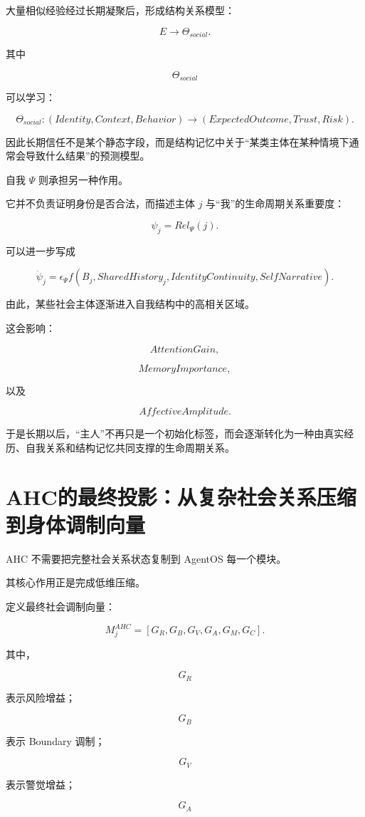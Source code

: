 大量相似经验经过长期凝聚后，形成结构关系模型：

\[
E
\rightarrow
\Theta_{social}.
\]

其中

\[
\Theta_{social}
\]

可以学习：

\[
\Theta_{social}
:
(
Identity,
Context,
Behavior
)
\rightarrow
(
ExpectedOutcome,
Trust,
Risk
).
\]

因此长期信任不是某个静态字段，而是结构记忆中关于“某类主体在某种情境下通常会导致什么结果”的预测模型。

自我 $\Psi$ 则承担另一种作用。

它并不负责证明身份是否合法，而描述主体 $j$ 与“我”的生命周期关系重要度：

\[
\psi_j
=
Rel_\Psi(j).
\]

可以进一步写成

\[
\dot\psi_j
=
\epsilon_\Psi
f
\left(
B_j,
SharedHistory_j,
IdentityContinuity,
SelfNarrative
\right).
\]

由此，某些社会主体逐渐进入自我结构中的高相关区域。

这会影响：

\[
AttentionGain,
\]

\[
MemoryImportance,
\]

以及

\[
AffectiveAmplitude.
\]

于是长期以后，“主人”不再只是一个初始化标签，而会逐渐转化为一种由真实经历、自我关系和结构记忆共同支撑的生命周期关系。


\section{AHC的最终投影：从复杂社会关系压缩到身体调制向量}

AHC 不需要把完整社会关系状态复制到 AgentOS 每一个模块。

其核心作用正是完成低维压缩。

定义最终社会调制向量：

\[
\boxed{
M_j^{AHC}
=
[
G_R,
G_B,
G_V,
G_A,
G_M,
G_C
].
}
\]

其中，

\[
G_R
\]

表示风险增益；

\[
G_B
\]

表示 Boundary 调制；

\[
G_V
\]

表示警觉增益；

\[
G_A
\]

